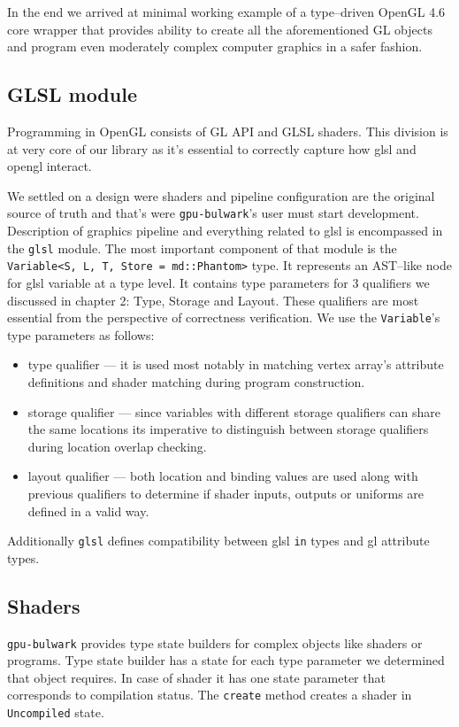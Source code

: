 In the end we arrived at minimal working example of a type--driven OpenGL 4.6 core wrapper that provides ability to create all the aforementioned GL objects
and program even moderately complex computer graphics in a safer fashion.

\subsection{GLSL module}

Programming in OpenGL consists of GL API and GLSL shaders. This division is at very core of our library as it's essential to correctly capture how glsl and opengl interact.

We settled on a design were shaders and pipeline configuration are the original source of truth and that's were \texttt{gpu-bulwark}'s user must start development.
Description of graphics pipeline and everything related to glsl is encompassed in the \texttt{glsl} module.
The most important component of that module is the \texttt{Variable<S, L, T, Store = md::Phantom>} type.
It represents an AST--like node for glsl variable at a type level.
It contains type parameters for 3 qualifiers we discussed in chapter 2: Type, Storage and Layout. These qualifiers are most essential from the perspective of correctness verification.
We use the \texttt{Variable}'s type parameters as follows:
\begin{itemize}
    \item type qualifier --- it is used most notably in matching vertex array's attribute definitions and shader matching during program construction.
    \item storage qualifier --- since variables with different storage qualifiers can share the same locations its imperative to distinguish between storage qualifiers during location overlap checking.
    \item layout qualifier --- both location and binding values are used along with previous qualifiers to determine if shader inputs, outputs or uniforms are defined in a valid way.
\end{itemize}

Additionally \texttt{glsl} defines compatibility between glsl \texttt{in} types and gl attribute types.

\subsection{Shaders}

\texttt{gpu-bulwark} provides type state builders for complex objects like shaders or programs. Type state builder has a state for each type parameter we determined that object requires.
In case of shader it has one state parameter that corresponds to compilation status. The \texttt{create} method creates a shader in \texttt{Uncompiled} state.

